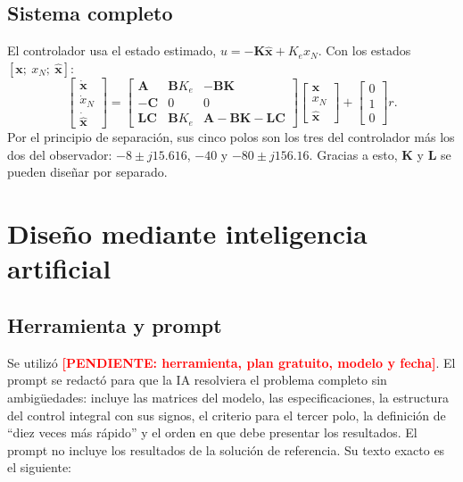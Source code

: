 \documentclass[conference,a4paper]{IEEEtran}
\newcommand{\pendiente}[1]{\textcolor{red}{\textbf{[PENDIENTE: #1]}}}
\begin{document}
\subsection{Sistema completo}
El controlador usa el estado estimado, $u = -\mathbf{K}\hat{\mathbf{x}} + K_e x_N$. Con los estados $[\mathbf{x};\ x_N;\ \hat{\mathbf{x}}]$:
\begin{equation}
\begin{bmatrix}\dot{\mathbf{x}}\\ \dot{x}_N\\ \dot{\hat{\mathbf{x}}}\end{bmatrix} =
\begin{bmatrix}\mathbf{A} & \mathbf{B}K_e & -\mathbf{B}\mathbf{K}\\ -\mathbf{C} & 0 & 0\\ \mathbf{L}\mathbf{C} & \mathbf{B}K_e & \mathbf{A} - \mathbf{B}\mathbf{K} - \mathbf{L}\mathbf{C}\end{bmatrix}
\begin{bmatrix}\mathbf{x}\\ x_N\\ \hat{\mathbf{x}}\end{bmatrix} +
\begin{bmatrix}0\\ 1\\ 0\end{bmatrix} r.
\end{equation}
Por el principio de separación, sus cinco polos son los tres del controlador más los dos del observador: $-8 \pm j15.616$, $-40$ y $-80 \pm j156.16$. Gracias a esto, $\mathbf{K}$ y $\mathbf{L}$ se pueden diseñar por separado.

\section{Diseño mediante inteligencia artificial}

\subsection{Herramienta y prompt}
Se utilizó \pendiente{herramienta, plan gratuito, modelo y fecha}. El prompt se redactó para que la IA resolviera el problema completo sin ambigüedades: incluye las matrices del modelo, las especificaciones, la estructura del control integral con sus signos, el criterio para el tercer polo, la definición de ``diez veces más rápido'' y el orden en que debe presentar los resultados. El prompt no incluye los resultados de la solución de referencia. Su texto exacto es el siguiente:
\end{document}
